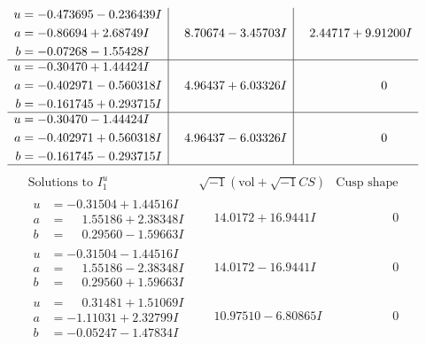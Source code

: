 \documentclass[1p]{elsarticle_modified}
\theoremstyle{definition}
\newcommand{\I}{\sqrt{-1}}
\begin{document}
$$\begin{array}{c|c|c}
\begin{aligned}
u &= -0.473695 - 0.236439 I \\
a &= -0.86694 + 2.68749 I \\
b &= -0.07268 - 1.55428 I\end{aligned}
 & \phantom{-}8.70674 - 3.45703 I & \phantom{-}2.44717 + 9.91200 I \\ \hline\begin{aligned}
u &= -0.30470 + 1.44424 I \\
a &= -0.402971 - 0.560318 I \\
b &= -0.161745 + 0.293715 I\end{aligned}
 & \phantom{-}4.96437 + 6.03326 I & \phantom{-0.000000 } 0 \\ \hline\begin{aligned}
u &= -0.30470 - 1.44424 I \\
a &= -0.402971 + 0.560318 I \\
b &= -0.161745 - 0.293715 I\end{aligned}
 & \phantom{-}4.96437 - 6.03326 I & \phantom{-0.000000 } 0\\
 \hline 
 \end{array}$$\newpage$$\begin{array}{c|c|c}  
\text{Solutions to }I^u_{1}& \I (\text{vol} + \sqrt{-1}CS) & \text{Cusp shape}\\
 \hline 
\begin{aligned}
u &= -0.31504 + 1.44516 I \\
a &= \phantom{-}1.55186 + 2.38348 I \\
b &= \phantom{-}0.29560 - 1.59663 I\end{aligned}
 & \phantom{-}14.0172 + 16.9441 I & \phantom{-0.000000 } 0 \\ \hline\begin{aligned}
u &= -0.31504 - 1.44516 I \\
a &= \phantom{-}1.55186 - 2.38348 I \\
b &= \phantom{-}0.29560 + 1.59663 I\end{aligned}
 & \phantom{-}14.0172 - 16.9441 I & \phantom{-0.000000 } 0 \\ \hline\begin{aligned}
u &= \phantom{-}0.31481 + 1.51069 I \\
a &= -1.11031 + 2.32799 I \\
b &= -0.05247 - 1.47834 I\end{aligned}
 & \phantom{-}10.97510 - 6.80865 I & \phantom{-0.000000 } 0 \\ \hline\begin{aligned}

\end{aligned}
\end{array}$$
\end{document}
